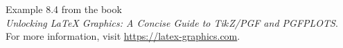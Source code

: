 \documentclass{article}
\begin{document}
Example 8.4 from the book\\
\emph{Unlocking LaTeX Graphics: A Concise Guide to Ti$k$Z/PGF and PGFPLOTS}.\\
For more information, visit \url{https://latex-graphics.com}.
\par\bigskip

\pgfplotstabletranspose[colnames from=idx,input colnames to=idx]
  {\bycol}{\byrow}
\pgfplotstabletypeset[string type,font=\ttfamily]\bycol
\end{document}
